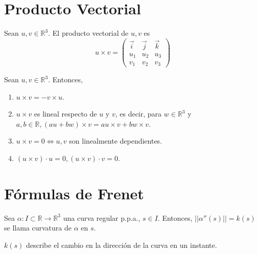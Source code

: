 \section{Producto Vectorial}

\begin{defn}
  Sean $u, v \in \mathbb{R}^{3}$. El producto vectorial de $u, v$ es
  \[ 
    u \times v = 
    \begin{pmatrix}
       \vec{i} & \vec{j} & \vec{k}\\
       u_{1} & u_{2} & u_{3}\\
       v_{1} & v_{2} & v_{3}
    \end{pmatrix}
  \] 
\end{defn}

\begin{prop}
  Sean $u, v \in \mathbb{R}^{3}$. Entonces,
  \begin{enumerate}[label=(\roman*)]
    \item $u \times v = -v \times u$.
    \item $u \times v$ es lineal respecto de $u$ y $v$, es decir, para $w \in \mathbb{R}^{3}$ y $a, b \in \mathbb{R}, (au + bw) \times v = au \times v + bw \times v$.
    \item $u \times v = 0 \Leftrightarrow u, v$ son linealmente dependientes.
    \item $(u \times v) \cdot u = 0, (u \times v) \cdot v = 0$.
  \end{enumerate}
\end{prop}

\section{Fórmulas de Frenet}

\begin{defn}[Curvatura]
  Sea $\alpha : I \subset \mathbb{R} \to \mathbb{R}^{3}$ una curva regular p.p.a., $s \in I$. Entonces, $||\alpha''(s)|| = k(s)$ se llama curvatura de $\alpha$ en $s$.
\end{defn}
 
\begin{obs}
  $k(s)$ describe el cambio en la dirección de la curva en un instante.
\end{obs}



